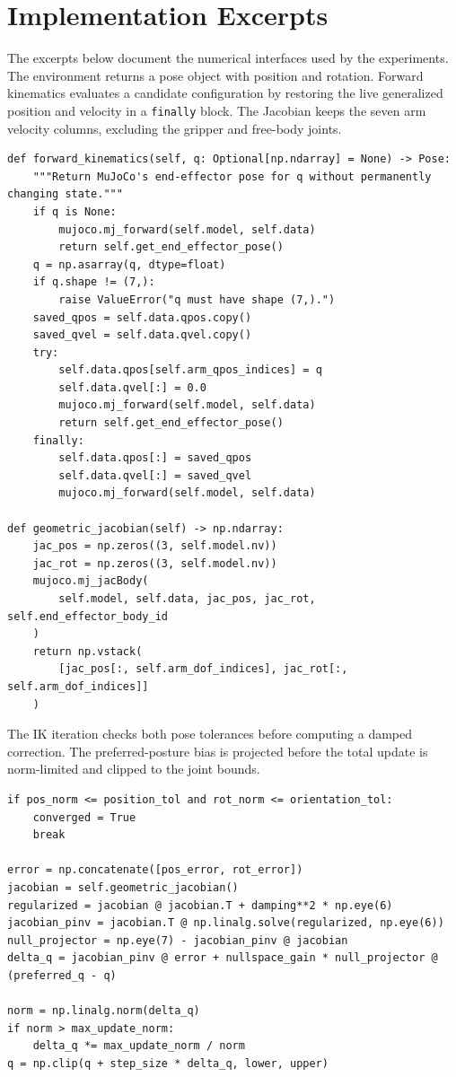 \documentclass[12pt,a4paper]{article}
\begin{document}
\appendix
\section{Implementation Excerpts}
The excerpts below document the numerical interfaces used by the experiments. The environment returns a pose object with position and rotation. Forward kinematics evaluates a candidate configuration by restoring the live generalized position and velocity in a \texttt{finally} block. The Jacobian keeps the seven arm velocity columns, excluding the gripper and free-body joints.

\begin{lstlisting}[caption={State-preserving forward kinematics and arm Jacobian from the environment.}]
def forward_kinematics(self, q: Optional[np.ndarray] = None) -> Pose:
    """Return MuJoCo's end-effector pose for q without permanently changing state."""
    if q is None:
        mujoco.mj_forward(self.model, self.data)
        return self.get_end_effector_pose()
    q = np.asarray(q, dtype=float)
    if q.shape != (7,):
        raise ValueError("q must have shape (7,).")
    saved_qpos = self.data.qpos.copy()
    saved_qvel = self.data.qvel.copy()
    try:
        self.data.qpos[self.arm_qpos_indices] = q
        self.data.qvel[:] = 0.0
        mujoco.mj_forward(self.model, self.data)
        return self.get_end_effector_pose()
    finally:
        self.data.qpos[:] = saved_qpos
        self.data.qvel[:] = saved_qvel
        mujoco.mj_forward(self.model, self.data)

def geometric_jacobian(self) -> np.ndarray:
    jac_pos = np.zeros((3, self.model.nv))
    jac_rot = np.zeros((3, self.model.nv))
    mujoco.mj_jacBody(
        self.model, self.data, jac_pos, jac_rot, self.end_effector_body_id
    )
    return np.vstack(
        [jac_pos[:, self.arm_dof_indices], jac_rot[:, self.arm_dof_indices]]
    )

\end{lstlisting}

The IK iteration checks both pose tolerances before computing a damped correction. The preferred-posture bias is projected before the total update is norm-limited and clipped to the joint bounds.

\begin{lstlisting}[caption={Convergence test and damped least-squares update inside the IK loop.}]
if pos_norm <= position_tol and rot_norm <= orientation_tol:
    converged = True
    break

error = np.concatenate([pos_error, rot_error])
jacobian = self.geometric_jacobian()
regularized = jacobian @ jacobian.T + damping**2 * np.eye(6)
jacobian_pinv = jacobian.T @ np.linalg.solve(regularized, np.eye(6))
null_projector = np.eye(7) - jacobian_pinv @ jacobian
delta_q = jacobian_pinv @ error + nullspace_gain * null_projector @ (preferred_q - q)

norm = np.linalg.norm(delta_q)
if norm > max_update_norm:
    delta_q *= max_update_norm / norm
q = np.clip(q + step_size * delta_q, lower, upper)
\end{lstlisting}
\end{document}

